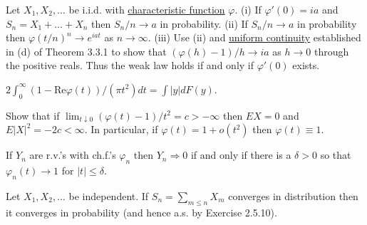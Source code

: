   \begin{exercise}[Durrett 3.3.14]
    Let $X_1, X_2, \dots$ be i.i.d. with \hyperref[def:characteristic-function]{characteristic function} $\varphi$. (i) If $\varphi'(0) = ia$ and $S_n = X_1 + \dots + X_n$ then $S_n/n \to a$ in probability. (ii) If $S_n/n \to a$ in probability then $\varphi(t/n)^n \to e^{iat}$ as $n \to \infty$. (iii) Use (ii) and \hyperref[real-def:uniform-continuity]{uniform continuity} established in (d) of Theorem 3.3.1 to show that $(\varphi(h) - 1)/h \to ia$ as $h \to 0$ through the positive reals. Thus the weak law holds if and only if $\varphi'(0)$ exists.
  \end{exercise}
  \begin{solution}

  \end{solution}

  \begin{exercise}[Durrett 3.3.15]
    $2 \int_0^\infty (1 - \text{Re} \varphi(t))/(\pi t^2) dt = \int |y| dF(y)$.
  \end{exercise}
  \begin{solution}

  \end{solution}

  \begin{exercise}[Durrett 3.3.16]
    Show that if $\lim_{t \downarrow 0}(\varphi(t) - 1)/t^2 = c > -\infty$ then $EX = 0$ and $E|X|^2 = -2c < \infty$. In particular, if $\varphi(t) = 1 + o(t^2)$ then $\varphi(t) \equiv 1$.
  \end{exercise}
  \begin{solution}

  \end{solution}

  \begin{exercise}[Durrett 3.3.17]
    If $Y_n$ are r.v.'s with ch.f.'s $\varphi_n$ then $Y_n \Rightarrow 0$ if and only if there is a $\delta > 0$ so that $\varphi_n(t) \to 1$ for $|t| \leq \delta$.
  \end{exercise}
  \begin{solution}

  \end{solution}

  \begin{exercise}[Durrett 3.3.18]
    Let $X_1, X_2, \dots$ be independent. If $S_n = \sum_{m \leq n} X_m$ converges in distribution then it converges in probability (and hence a.s. by Exercise 2.5.10).
  \end{exercise}
  \begin{solution}

  \end{solution}

